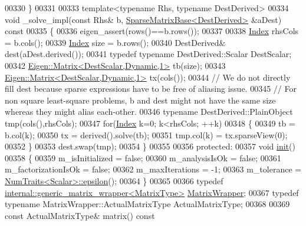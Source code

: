 \begin{DoxyCode}
00330   \}
00331   
00333   \textcolor{keyword}{template}<\textcolor{keyword}{typename} Rhs, \textcolor{keyword}{typename} DestDerived>
00334   \textcolor{keywordtype}{void} \_solve\_impl(\textcolor{keyword}{const} Rhs& b, \hyperlink{group___sparse_core___module_class_eigen_1_1_sparse_matrix_base}{SparseMatrixBase<DestDerived>} &aDest)\textcolor{keyword}{ const}
00335 \textcolor{keyword}{  }\{
00336     eigen\_assert(rows()==b.rows());
00337     
00338     \hyperlink{namespace_eigen_a62e77e0933482dafde8fe197d9a2cfde}{Index} rhsCols = b.cols();
00339     \hyperlink{namespace_eigen_a62e77e0933482dafde8fe197d9a2cfde}{Index} size = b.rows();
00340     DestDerived& dest(aDest.derived());
00341     \textcolor{keyword}{typedef} \textcolor{keyword}{typename} DestDerived::Scalar DestScalar;
00342     \hyperlink{group___core___module_class_eigen_1_1_matrix}{Eigen::Matrix<DestScalar,Dynamic,1>} tb(size);
00343     \hyperlink{group___core___module_class_eigen_1_1_matrix}{Eigen::Matrix<DestScalar,Dynamic,1>} tx(cols());
00344     \textcolor{comment}{// We do not directly fill dest because sparse expressions have to be free of aliasing issue.}
00345     \textcolor{comment}{// For non square least-square problems, b and dest might not have the same size whereas they might
       alias each-other.}
00346     \textcolor{keyword}{typename} DestDerived::PlainObject tmp(cols(),rhsCols);
00347     \textcolor{keywordflow}{for}(\hyperlink{namespace_eigen_a62e77e0933482dafde8fe197d9a2cfde}{Index} k=0; k<rhsCols; ++k)
00348     \{
00349       tb = b.col(k);
00350       tx = derived().solve(tb);
00351       tmp.col(k) = tx.sparseView(0);
00352     \}
00353     dest.swap(tmp);
00354   \}
00355 
00356 \textcolor{keyword}{protected}:
00357   \textcolor{keywordtype}{void} \hyperlink{structinit}{init}()
00358   \{
00359     m\_isInitialized = \textcolor{keyword}{false};
00360     m\_analysisIsOk = \textcolor{keyword}{false};
00361     m\_factorizationIsOk = \textcolor{keyword}{false};
00362     m\_maxIterations = -1;
00363     m\_tolerance = \hyperlink{group___core___module_struct_eigen_1_1_num_traits}{NumTraits<Scalar>::epsilon}();
00364   \}
00365 
00366   \textcolor{keyword}{typedef} \hyperlink{class_eigen_1_1internal_1_1generic__matrix__wrapper}{internal::generic\_matrix\_wrapper<MatrixType>} 
      \hyperlink{class_eigen_1_1internal_1_1generic__matrix__wrapper}{MatrixWrapper};
00367   \textcolor{keyword}{typedef} \textcolor{keyword}{typename} MatrixWrapper::ActualMatrixType ActualMatrixType;
00368 
00369   \textcolor{keyword}{const} ActualMatrixType& matrix()\textcolor{keyword}{ const}

\end{DoxyCode}
